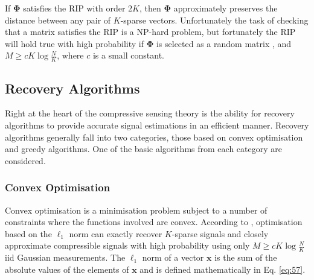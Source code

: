 If $\boldsymbol{\Phi}$ satisfies the RIP with order $2K$, then $\boldsymbol{\Phi}$ approximately preserves the distance between any pair of $K$-sparse vectors. Unfortunately the task of checking that a matrix satisfies the RIP is a NP-hard problem, but fortunately the RIP will hold true with high probability if $\boldsymbol{\Phi}$ is selected as a random matrix \cite{Candes2006a}, and $M \geq cK\log \frac{N}{K}$, where $c$ is a small constant. 



\subsection{Recovery Algorithms}
\label{sec:recovery-algorithms}

Right at the heart of the compressive sensing theory is the ability for recovery algorithms to provide accurate signal estimations in an efficient manner. Recovery algorithms generally fall into two categories, those based on convex optimisation and greedy algorithms. One of the basic algorithms from each category are considered.   

\subsubsection{Convex Optimisation}
\label{sec:convex-optimization}

Convex optimisation is a minimisation problem subject to a number of constraints where the functions involved are convex. According to \cite{Baraniuk2007}, optimisation based on the $\ell_1$ norm can exactly recover $K$-sparse signals and closely approximate compressible signals with high probability using only $M  \geq cK \log \frac{N}{K} $ iid Gaussian measurements. The $\ell_1$ norm of a vector $\boldsymbol{x}$ is the sum of the absolute values of the elements of $\boldsymbol{x}$ and is defined mathematically in Eq. \eqref{eq:57}.  %

